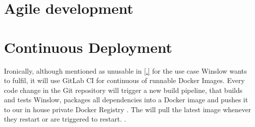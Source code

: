 \section{Agile development}


\section{Continuous Deployment}

Ironically, although mentioned as unusable in \autoref{.} for the use case Winslow wants to fulfil, it will use GitLab CI for continuous  of runnable Docker Images.
Every code change in the Git repository will trigger a new build pipeline, that builds and tests Winslow, packages all dependencies  into a Docker image and pushes it to our in house private Docker Registry .
The  will pull the latest image whenever they restart or are triggered to restart.
\todo.